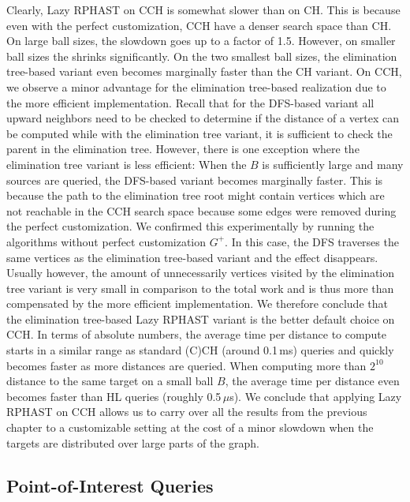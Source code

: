 \documentclass[a4paper, english, cleveref]{lipics-v2021}
\begin{document}
Clearly, Lazy RPHAST on CCH is somewhat slower than on CH.
This is because even with the perfect customization, CCH have a denser search space than CH.
On large ball sizes, the slowdown goes up to a factor of 1.5.
However, on smaller ball sizes the shrinks significantly.
On the two smallest ball sizes, the elimination tree-based variant even becomes marginally faster than the CH variant.
On CCH, we observe a minor advantage for the elimination tree-based realization due to the more efficient implementation.
Recall that for the DFS-based variant all upward neighbors need to be checked to determine if the distance of a vertex can be computed while with the elimination tree variant, it is sufficient to check the parent in the elimination tree.
However, there is one exception where the elimination tree variant is less efficient:
When the $B$ is sufficiently large and many sources are queried, the DFS-based variant becomes marginally faster.
This is because the path to the elimination tree root might contain vertices which are not reachable in the CCH search space because some edges were removed during the perfect customization.
We confirmed this experimentally by running the algorithms without perfect customization $G^+$.
In this case, the DFS traverses the same vertices as the elimination tree-based variant and the effect disappears.
Usually however, the amount of unnecessarily vertices visited by the elimination tree variant is very small in comparison to the total work and is thus more than compensated by the more efficient implementation.
We therefore conclude that the elimination tree-based Lazy RPHAST variant is the better default choice on CCH.
In terms of absolute numbers, the average time per distance to compute starts in a similar range as standard (C)CH (around 0.1\,ms) queries and quickly becomes faster as more distances are queried.
When computing more than $2^{10}$ distance to the same target on a small ball $B$, the average time per distance even becomes faster than HL queries (roughly 0.5\,$\mu$s).
We conclude that applying Lazy RPHAST on CCH allows us to carry over all the results from the previous chapter to a customizable setting at the cost of a minor slowdown when the targets are distributed over large parts of the graph.

\subsection{Point-of-Interest Queries}
\end{document}
